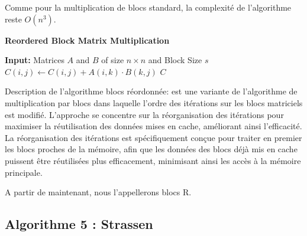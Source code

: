 \documentclass[../CSC_5RO06_TA.tex]{subfiles}
\begin{document}
Comme pour la multiplication de blocs standard, la complexité de l'algorithme reste $O(n^3)$.

\begin{algorithm}
\caption{\textbf{Reordered Block Matrix Multiplication}}
\begin{algorithmic}[1]
    \State \textbf{Input:} Matrices $A$ and $B$ of size $n \times n$ and Block Size $s$
                            \State $C(i,j) \gets C(i,j) + A(i,k) \cdot B(k,j)$
                        \EndFor
                    \EndFor
                \EndFor
            \EndFor
        \EndFor
    \EndFor
    \State \Return $C$
\end{algorithmic}
\end{algorithm}

Description de l'algorithme blocs réordonnée: est une variante de l'algorithme de multiplication par blocs dans laquelle l'ordre des itérations sur les blocs matriciels est modifié. L'approche se concentre sur la réorganisation des itérations pour maximiser la réutilisation des données mises en cache, améliorant ainsi l'efficacité. La réorganisation des itérations est spécifiquement conçue pour traiter en premier les blocs proches de la mémoire, afin que les données des blocs déjà mis en cache puissent être réutilisées plus efficacement, minimisant ainsi les accès à la mémoire principale.

A partir de maintenant, nous l'appellerons blocs R.

\subsection{Algorithme 5 : Strassen}
\end{document}
